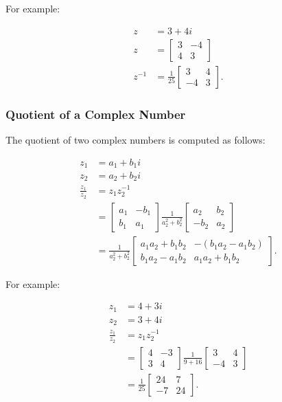 \documentclass[10pt]{article}
\begin{document}
For example:

$$
\begin{aligned}
z & =3+4 i \\
z & =\left[\begin{array}{cc}
3 & -4 \\
4 & 3
\end{array}\right] \\
z^{-1} & =\frac{1}{25}\left[\begin{array}{cc}
3 & 4 \\
-4 & 3
\end{array}\right] .
\end{aligned}
$$

\subsubsection{Quotient of a Complex Number}
The quotient of two complex numbers is computed as follows:

$$
\begin{aligned}
z_{1} & =a_{1}+b_{1} i \\
z_{2} & =a_{2}+b_{2} i \\
\frac{z_{1}}{z_{2}} & =z_{1} z_{2}^{-1} \\
& =\left[\begin{array}{cc}
a_{1} & -b_{1} \\
b_{1} & a_{1}
\end{array}\right] \frac{1}{a_{2}^{2}+b_{2}^{2}}\left[\begin{array}{cc}
a_{2} & b_{2} \\
-b_{2} & a_{2}
\end{array}\right] \\
& =\frac{1}{a_{2}^{2}+b_{2}^{2}}\left[\begin{array}{cc}
a_{1} a_{2}+b_{1} b_{2} & -\left(b_{1} a_{2}-a_{1} b_{2}\right) \\
b_{1} a_{2}-a_{1} b_{2} & a_{1} a_{2}+b_{1} b_{2}
\end{array}\right] .
\end{aligned}
$$

For example:

$$
\begin{aligned}
z_{1} & =4+3 i \\
z_{2} & =3+4 i \\
\frac{z_{1}}{z_{2}} & =z_{1} z_{2}^{-1} \\
& =\left[\begin{array}{cc}
4 & -3 \\
3 & 4
\end{array}\right] \frac{1}{9+16}\left[\begin{array}{cc}
3 & 4 \\
-4 & 3
\end{array}\right] \\
& =\frac{1}{25}\left[\begin{array}{cc}
24 & 7 \\
-7 & 24
\end{array}\right] .
\end{aligned}
$$
\end{document}
